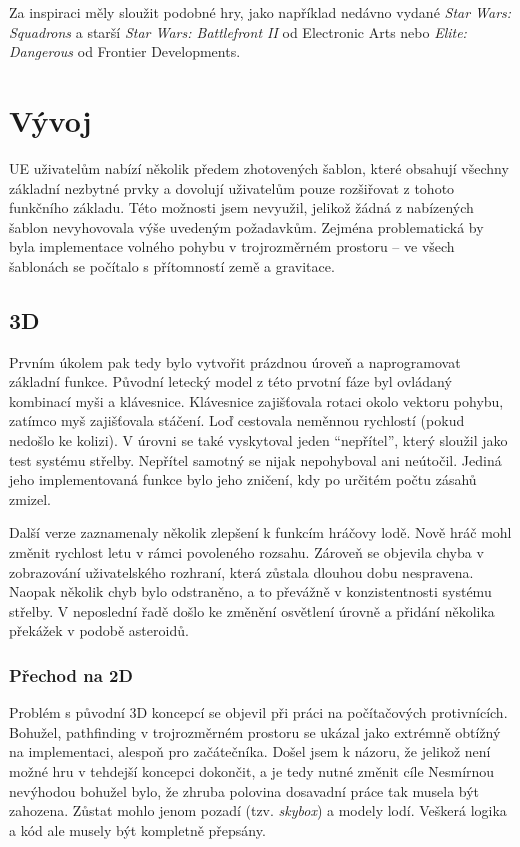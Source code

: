 \documentclass[12pt,a4paper,hidelinks]{article}
\begin{document}
Za inspiraci měly sloužit podobné hry, jako například nedávno vydané \textit{Star Wars: Squadrons}\cite{squadrons} a starší \textit{Star Wars: Battlefront II}\cite{bf2} od Electronic Arts nebo \textit{Elite: Dangerous}\cite{elite} od Frontier Developments.

\section{Vývoj}
UE uživatelům nabízí několik předem zhotovených šablon, které obsahují všechny základní nezbytné prvky a dovolují uživatelům pouze rozšiřovat z tohoto funkčního základu. Této možnosti jsem nevyužil, jelikož žádná z nabízených šablon nevyhovovala výše uvedeným požadavkům. Zejména problematická by byla implementace volného pohybu v trojrozměrném prostoru – ve všech šablonách se počítalo s přítomností země a gravitace.

\subsection{3D}
Prvním úkolem pak tedy bylo vytvořit prázdnou úroveň a naprogramovat základní funkce. Původní letecký model z této prvotní fáze byl ovládaný kombinací myši a klávesnice. Klávesnice zajišťovala rotaci okolo vektoru pohybu, zatímco myš zajišťovala stáčení. Loď cestovala neměnnou rychlostí (pokud nedošlo ke kolizi). V úrovni se také vyskytoval jeden \enquote{nepřítel}, který sloužil jako test systému střelby. Nepřítel samotný se nijak nepohyboval ani neútočil. Jediná jeho implementovaná funkce bylo jeho zničení, kdy po určitém počtu zásahů zmizel.

Další verze zaznamenaly několik zlepšení k funkcím hráčovy lodě. Nově hráč mohl změnit rychlost letu v rámci povoleného rozsahu. Zároveň se objevila chyba v zobrazování uživatelského rozhraní, která zůstala dlouhou dobu nespravena. Naopak několik chyb bylo odstraněno, a to převážně v konzistentnosti systému střelby. V neposlední řadě došlo ke změnění osvětlení úrovně a přidání několika překážek v podobě asteroidů.


\subsubsection{Přechod na 2D}
Problém s původní 3D koncepcí se objevil při práci na počítačových protivnících. Bohužel, pathfinding v trojrozměrném prostoru se ukázal jako extrémně obtížný na implementaci, alespoň pro začátečníka. Došel jsem k názoru, že jelikož není možné hru v tehdejší koncepci dokončit, a je tedy nutné změnit cíle Nesmírnou nevýhodou bohužel bylo, že zhruba polovina dosavadní práce tak musela být zahozena. Zůstat mohlo jenom pozadí (tzv. \textit{skybox}) a modely lodí. Veškerá logika a kód ale musely být kompletně přepsány.
\end{document}
